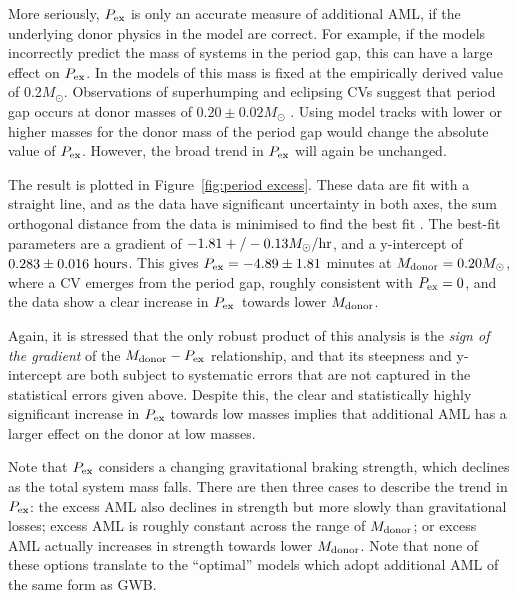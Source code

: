 More seriously, $P_{\rm ex}$ is only an accurate measure of additional AML, if the underlying donor physics in the model are correct. For example, if the models incorrectly predict the mass of systems in the period gap, this can have a large effect on $P_{\rm ex}$. In the models of \citet{knigge11} this mass is fixed at the empirically derived value of 0.2$M_\odot$. Observations of superhumping and eclipsing CVs suggest that period gap occurs at donor masses of $0.20 \pm 0.02 M_\odot$ \citep{knigge2006}. Using model tracks with lower or higher masses for the donor mass of the period gap would change the absolute value of $P_{\rm ex}$. However, the broad trend in $P_{\rm ex}$ will again be unchanged.

The result is plotted in Figure~\ref{fig:period excess}. These data are fit with a straight line, and as the data have significant uncertainty in both axes, the sum orthogonal distance from the data is minimised to find the best fit \citep{hogg2010}. The best-fit parameters are a gradient of $-1.81+/-  0.13 M_\odot / {\rm hr}$, and a y-intercept of $0.283 \pm 0.016 {\rm\ hours}$. This gives $P_{\rm ex} = -4.89 \pm 1.81$ minutes at $M_{\rm donor} = 0.20M_\odot$, where a CV emerges from the period gap, roughly consistent with $P_{\rm ex}=0$, and the data show a clear increase in $P_{\rm ex}$\ towards lower $M_{\rm donor}$.

Again, it is stressed that the only robust product of this analysis is the \textit{sign of the gradient} of the $M_{\rm donor} - P_{\rm ex}$ relationship, and that its steepness and y-intercept are both subject to systematic errors that are not captured in the statistical errors given above. Despite this, the clear and statistically highly significant increase in $P_{\rm ex}$ towards low masses implies that additional AML has a larger effect on the donor at low masses.

Note that $P_{\rm ex}$ considers a changing gravitational braking strength, which declines as the total system mass falls.
There are then three cases to describe the trend in $P_{\rm ex}$: the excess AML also declines in strength but more slowly than gravitational losses; excess AML is roughly constant across the range of $M_{\rm donor}$; or excess AML actually increases in strength towards lower $M_{\rm donor}$. Note that none of these options translate to the ``optimal'' \citet{knigge11} models which adopt additional AML of the same form as GWB.


